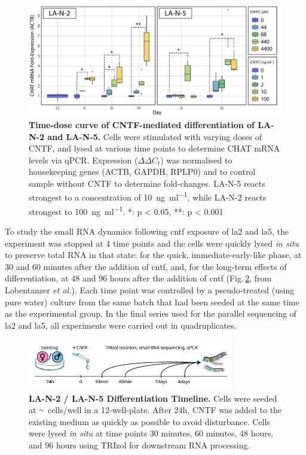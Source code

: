 \begin{figure}
\includegraphics[width=\textwidth]{figures/time-dose}
\caption[Time-dose curve, LA-N-2 and LA-N-5.]{\textbf{Time-dose curve of CNTF-mediated differentiation of LA-N-2 and LA-N-5.} Cells were stimulated with varying doses of CNTF, and lysed at various time points to determine CHAT mRNA levels via qPCR. Expression ($\Delta\Delta{C}_t$) was normalised to housekeeping genes (ACTB, GAPDH, RPLP0) and to control sample without CNTF to determine fold-changes. LA-N-5 reacts strongest to a concentration of \SI{10}{\nano\gram\per\milli\litre}, while LA-N-2 reacts strongest to \SI{100}{\nano\gram\per\milli\litre}. *: p < 0.05, **: p < 0.001
\label{fig:time-dose}}
\end{figure}

\begin{method}

To study the small RNA dynamics following \ac{cntf} exposure of \ac{la2} and \ac{la5}, the experiment was stopped at 4 time points and the cells were quickly lysed \textit{in situ} to preserve total RNA in that state: for the quick, immediate-early-like phase, at 30 and 60 minutes after the addition of \ac{cntf}, and, for the long-term effects of differentiation, at 48 and 96 hours after the addition of \ac{cntf} (Fig.\,\ref{fig:timepoints}, from Lobentanzer \textit{et al.}\cite{Lobentanzer2019a}). Each time point was controlled by a pseudo-treated (using pure water) culture from the same batch that had been seeded at the same time as the experimental group. In the final series used for the parallel sequencing of \ac{la2} and \ac{la5}, all experiments were carried out in quadruplicates. 

\end{method}

\begin{figure}
\centering
\includegraphics[width=0.8\textwidth]{figures/timepoints}
\caption[LA-N-2 / LA-N-5 Differentiation Timeline.]{\textbf{LA-N-2 / LA-N-5 Differentiation Timeline.} Cells were seeded at $\smallsim$ cells/well in a 12-well-plate. After 24h, CNTF was added to the existing medium as quickly as possible to avoid disturbance. Cells were lysed \textit{in situ} at time points 30 minutes, 60 minutes, 48 hours, and 96 hours using TRIzol for downstream RNA processing.
\label{fig:timepoints}}
\end{figure}

